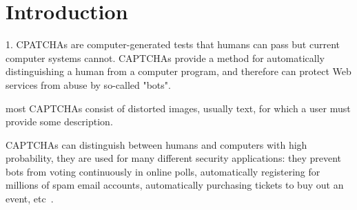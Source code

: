 \section{Introduction}

1. CPATCHAs are computer-generated tests that humans can pass but current computer systems cannot. CAPTCHAs provide a method for automatically distinguishing a human from a computer program, and therefore can protect Web services from abuse by so-called "bots".

most CAPTCHAs consist of distorted images, usually text, for which a user must provide some description. 

CAPTCHAs can distinguish between humans and computers with high probability, they are used for many different security applications: they prevent bots from voting continuously in online polls, automatically registering for millions of spam email accounts, automatically purchasing tickets to buy out an event, etc~\cite{Tam2008Breaking}. 